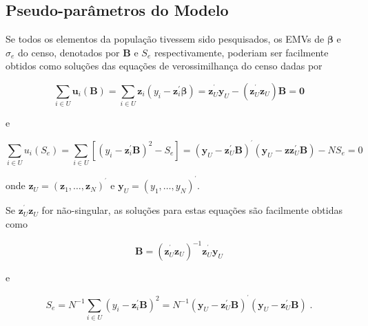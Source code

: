 \documentclass[]{book}
\numberwithin{example}{chapter}
\numberwithin{remark}{chapter}
\numberwithin{definition}{chapter}
\begin{document}
\subsection{Pseudo-parâmetros do
Modelo}\label{pseudo-parametros-do-modelo}

Se todos os elementos da população tivessem sido pesquisados, os EMVs de
\(\mathbf{\beta }\) e \(\sigma _{e}\) do censo, denotados por
\(\mathbf{B}\) e \(S_{e}\) respectivamente, poderiam ser facilmente
obtidos como soluções das equações de verossimilhança do censo dadas por

\begin{equation}
\sum\limits_{i\in U}\mathbf{u}_{i}\left( \mathbf{B}\right)
=\sum\limits_{i\in U}\mathbf{z}_{i}\left( y_{i}-\mathbf{z}_{i}^{\prime }%
\mathbf{\beta }\right) =\mathbf{z}_{U}^{^{\prime }}\mathbf{y}_{U}-\left( 
\mathbf{z}_{U}^{^{\prime }}\mathbf{z}_{U}\right) \mathbf{B}=\mathbf{0}
\label{eq:norm4}
\end{equation}

e

\begin{equation}
\sum\limits_{i\in U}u_{i}\left( S_{e}\right) =\sum\limits_{i\in U}\left[
\left( y_{i}-\mathbf{z}_{i}^{\prime }\mathbf{B}\right) ^{2}-S_{e}\right]
=\left( \mathbf{y}_{U}-\mathbf{z}_{U}^{\prime }\mathbf{B}\right) ^{^{\prime
}}\left( \mathbf{y}_{U}-\mathbf{zz}_{U}^{\prime }\mathbf{B}\right) -NS_{e}=0
\label{eq:norm5}
\end{equation}

onde
\(\mathbf{z}_{U}=\left( \mathbf{z}_{1},\ldots ,\mathbf{z}_{N}\right) ^{^{\prime }}\)
e \(\mathbf{y}_{U}=\left( y_{1},\ldots ,y_{N}\right) ^{^{\prime }}\).

Se \(\mathbf{z}_{U}^{^{\prime }}\mathbf{z}_{U}\) for não-singular, as
soluções para estas equações são facilmente obtidas como

\begin{equation}
\mathbf{B}=\left( \mathbf{z}_{U}^{^{\prime }}\mathbf{z}_{U}\right) ^{-1}
\mathbf{z}_{U}^{^{\prime }}\mathbf{y}_{U}  
\label{eq:norm6}
\end{equation}

e

\begin{equation}
S_{e}=N^{-1}\sum\limits_{i\in U}\left( y_{i}-\mathbf{z}_{i}^{\prime }\mathbf{
B}\right) ^{2}=N^{-1}\left( \mathbf{y}_{U}-\mathbf{z}_{U}^{\prime }\mathbf{B}
\right) ^{^{\prime }}\left( \mathbf{y}_{U}-\mathbf{z}_{U}^{\prime }\mathbf{B}
\right) \;.  
\label{eq:norm7}
\end{equation}
\end{document}
